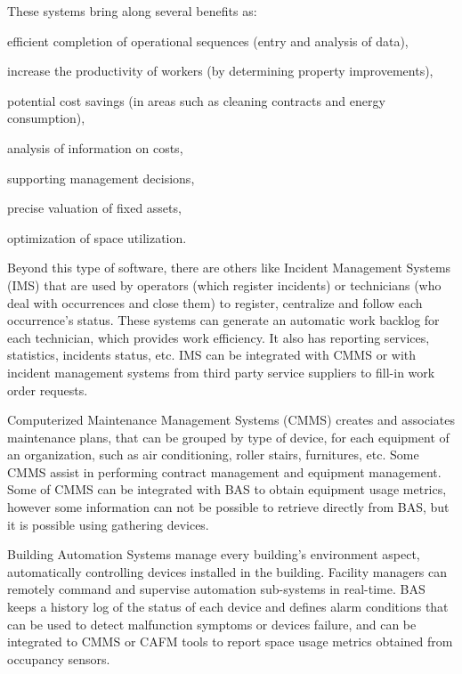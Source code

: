 These systems bring along several benefits as: 
\begin{enumerate*}[label=\itshape\roman{enumi})]
	\item efficient completion of operational sequences (entry and analysis of data),
	\item increase the productivity of workers (by determining property improvements),
	\item potential cost savings (in areas such as cleaning contracts and energy consumption),
	\item analysis of information on costs,
	\item supporting management decisions, 
	\item precise valuation of fixed assets,
	\item optimization of space utilization.
\end{enumerate*}

Beyond this type of software, there are others like Incident Management Systems (IMS) that are used by operators (which register incidents) or technicians (who deal with occurrences and close them) to register, centralize and follow each occurrence's status. These systems can generate an automatic work backlog for each technician, which provides work efficiency. It also has reporting services, statistics, incidents status, etc. IMS can be integrated with CMMS or with incident management systems from third party service suppliers to fill-in work order requests.

Computerized Maintenance Management Systems (CMMS) creates and associates maintenance plans, that can be grouped by type of device, for each equipment of an organization, such as air conditioning, roller stairs, furnitures, etc. Some CMMS assist in performing contract management and equipment management. Some of CMMS can be integrated with BAS to obtain equipment usage metrics, however some information can not be possible to retrieve directly from BAS, but it is possible using gathering devices.

Building Automation Systems manage every building's environment aspect, automatically controlling devices installed in the building. Facility managers can remotely command and supervise automation sub-systems in real-time. BAS keeps a history log of the status of each device and defines alarm conditions that can be used to detect malfunction symptoms or devices failure, and can be integrated to CMMS or CAFM tools to report space usage metrics obtained from occupancy sensors.

